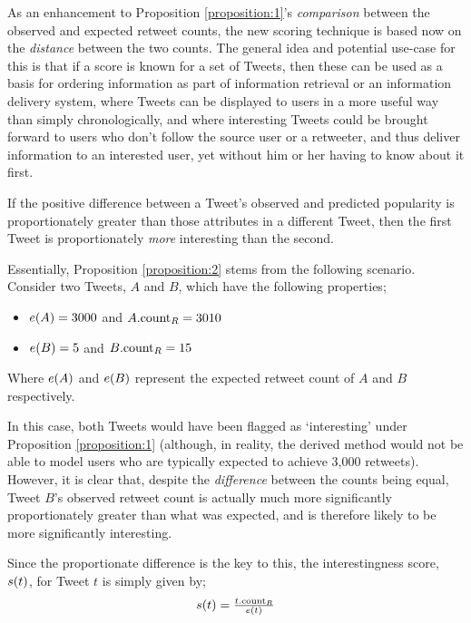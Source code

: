 As an enhancement to Proposition \ref{proposition:1}'s \textit{comparison} between the observed and expected retweet counts, the new scoring technique is based now on the \textit{distance} between the two counts. The general idea and potential use-case for this is that if a score is known for a set of Tweets, then these can be used as a basis for ordering information as part of information retrieval or an information delivery system, where Tweets can be displayed to users in a more useful way than simply chronologically, and where interesting Tweets could be brought forward to users who don't follow the source user or a retweeter, and thus deliver information to an interested user, yet without him or her having to know about it first.

\begin{myproposition}
\label{proposition:2}
If the positive difference between a Tweet's observed and predicted popularity is proportionately greater than those attributes in a different Tweet, then the first Tweet is proportionately \textit{more} interesting than the second.
\end{myproposition}

Essentially, Proposition \ref{proposition:2} stems from the following scenario. Consider two Tweets, $A$ and $B$, which have the following properties;
\begin{itemize}
    \item $e(A) = 3000$ and $A.\textrm{count}_R = 3010$
    \item $e(B) = 5$ and $B.\textrm{count}_R = 15$
\end{itemize}
Where $e(A)$ and $e(B)$ represent the expected retweet count of $A$ and $B$ respectively.

In this case, both Tweets would have been flagged as `interesting' under Proposition \ref{proposition:1} (although, in reality, the derived method would not be able to model users who are typically expected to achieve 3,000 retweets). However, it is clear that, despite the \textit{difference} between the counts being equal, Tweet $B$'s observed retweet count is actually much more significantly proportionately greater than what was expected, and is therefore likely to be more significantly interesting.

Since the proportionate difference is the key to this, the interestingness score, $s(t)$, for Tweet $t$ is simply given by;
\[
\begin{array}{cc}
    s(t) = \frac{t.\textrm{count}_R}{e(t)}
\end{array}
\]

